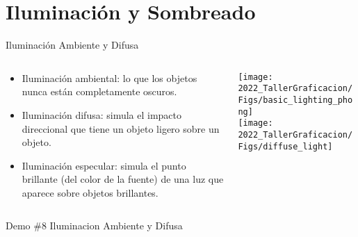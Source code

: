 \section{Iluminación y Sombreado}
\begin{frame}{Iluminación Ambiente y Difusa}
\begin{columns}
\begin{column}{0.5\textwidth}
\begin{itemize}
\item Iluminación ambiental: lo que los objetos nunca están completamente oscuros. 
\item Iluminación difusa: simula el impacto direccional que tiene un objeto ligero sobre un objeto. 
\item Iluminación especular: simula el punto brillante (del color de la fuente) de una luz que aparece sobre objetos brillantes.
\end{itemize}
\end{column}
\begin{column}{0.5\textwidth}
\begin{center}
 \texttt{[image: 2022\_TallerGraficacion/Figs/basic\_lighting\_phong]}\\
 \texttt{[image: 2022\_TallerGraficacion/Figs/diffuse\_light]}
 \end{center}
\end{column}
\end{columns}
\begin{block}{Demo \#8}
Iluminacion Ambiente y Difusa
\end{block}
\end{frame}


